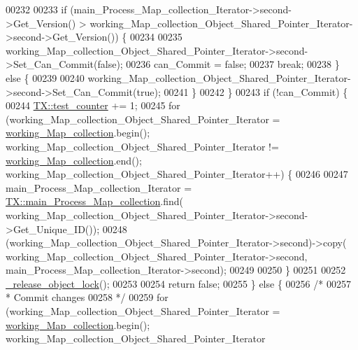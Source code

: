 \begin{DoxyCode}
00232 
00233         \textcolor{keywordflow}{if} (main\_Process\_Map\_collection\_Iterator->second->Get\_Version() > 
      working\_Map\_collection\_Object\_Shared\_Pointer\_Iterator->second->Get\_Version()) \{
00234 
00235             working\_Map\_collection\_Object\_Shared\_Pointer\_Iterator->second->Set\_Can\_Commit(\textcolor{keyword}{false});
00236             can\_Commit = \textcolor{keyword}{false};
00237             \textcolor{keywordflow}{break};
00238         \} \textcolor{keywordflow}{else} \{
00239 
00240             working\_Map\_collection\_Object\_Shared\_Pointer\_Iterator->second->Set\_Can\_Commit(\textcolor{keyword}{true});
00241         \}
00242     \}
00243     \textcolor{keywordflow}{if} (!can\_Commit) \{
00244         \hyperlink{class_t_x_a25838234aab99ae891a90eb8623a8b3c_a25838234aab99ae891a90eb8623a8b3c}{TX::test\_counter} += 1;
00245         \textcolor{keywordflow}{for} (working\_Map\_collection\_Object\_Shared\_Pointer\_Iterator = 
      \hyperlink{class_t_x_a81aafda16e2f20e36ec6c68e584668ff_a81aafda16e2f20e36ec6c68e584668ff}{working\_Map\_collection}.begin(); working\_Map\_collection\_Object\_Shared\_Pointer\_Iterator
       != \hyperlink{class_t_x_a81aafda16e2f20e36ec6c68e584668ff_a81aafda16e2f20e36ec6c68e584668ff}{working\_Map\_collection}.end(); 
      working\_Map\_collection\_Object\_Shared\_Pointer\_Iterator++) \{
00246           
00247             main\_Process\_Map\_collection\_Iterator  = 
      \hyperlink{class_t_x_a1a45d726894190695314464d7cd97c29_a1a45d726894190695314464d7cd97c29}{TX::main\_Process\_Map\_collection}.find(
      working\_Map\_collection\_Object\_Shared\_Pointer\_Iterator->second->Get\_Unique\_ID());
00248             (working\_Map\_collection\_Object\_Shared\_Pointer\_Iterator->second)->copy(
      working\_Map\_collection\_Object\_Shared\_Pointer\_Iterator->second, main\_Process\_Map\_collection\_Iterator->second);
00249 
00250         \}
00251         
00252         \hyperlink{class_t_x_a4c13d2015dc15d0f788fa9a1413f0463_a4c13d2015dc15d0f788fa9a1413f0463}{\_release\_object\_lock}();
00253 
00254         \textcolor{keywordflow}{return} \textcolor{keyword}{false};
00255     \} \textcolor{keywordflow}{else} \{
00256         \textcolor{comment}{/*}
00257 \textcolor{comment}{         * Commit changes
}
00258 \textcolor{comment}{         */}
00259         \textcolor{keywordflow}{for} (working\_Map\_collection\_Object\_Shared\_Pointer\_Iterator = 
      \hyperlink{class_t_x_a81aafda16e2f20e36ec6c68e584668ff_a81aafda16e2f20e36ec6c68e584668ff}{working\_Map\_collection}.begin(); working\_Map\_collection\_Object\_Shared\_Pointer\_Iterator

\end{DoxyCode}
